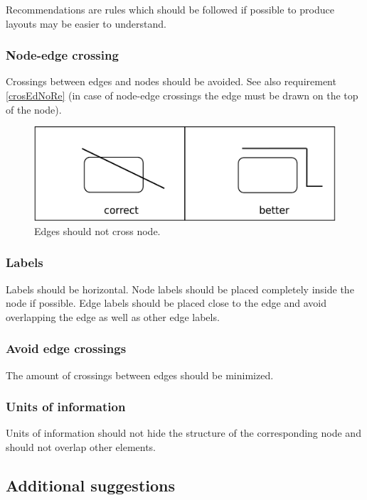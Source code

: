 Recommendations are rules which should be followed if possible to produce layouts may be easier to understand.

\subsubsection{Node-edge crossing}\label{crosEdNo}

Crossings between edges and nodes should be avoided. See also requirement \ref{crosEdNoRe} (in case of node-edge crossings the edge must be drawn on the top of the node).

\begin{figure}[h!]
  \centering
  \includegraphics[scale=0.3]{images/layout-node-edge-2}
  \caption{Edges should not cross node.}\label{fig:layout7}
\end{figure}


\subsubsection{Labels}

Labels should be horizontal. Node labels should be placed completely inside the node if possible. Edge labels should be placed close to the edge and avoid overlapping the edge as well as other edge labels.

\subsubsection{Avoid edge crossings}

The amount of crossings between edges should be minimized.

\subsubsection{Units of information}

Units of information should not hide the structure of the corresponding node and should not overlap other elements.

\subsection{Additional suggestions}

